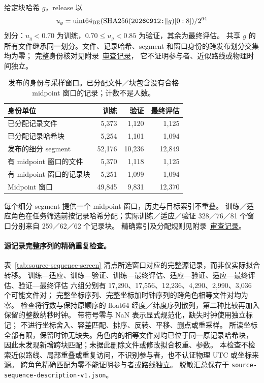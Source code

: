 给定块哈希 \(g\)，release 以
\[
u_g=\operatorname{uint64}_{\rm BE}
(\operatorname{SHA256}(\texttt{20260912:}\Vert g)[0:8])/2^{64}
\]
划分：\(u_g<0.70\) 为训练，\(0.70\leq u_g<0.85\) 为验证，其余为最终评估。
共享 \(g\) 的所有文件继承同一划分。文件、记录哈希、segment 和窗口身份的跨发布划分交集均为零；
完整身份核对见附录~\href{audit-notes.pdf\#sec:source-reconciliation-details}{审查记录}，
它不证明参与者、近似路线或物理时间独立。

\begin{table}[htbp]
\centering\small
\caption{发布的身份与采样窗口。已分配文件／块包含没有合格 midpoint 窗口的记录；计数不是人数。}
\label{tab:release-partition-identities}\hypertarget{tab:release-partition-identities}{}
\begin{tabular}{@{}p{.45\linewidth}rrr@{}}
\toprule
身份单位 & 训练 & 验证 & 最终评估\\
\midrule
已分配记录文件 & 5,373 & 1,120 & 1,125\\
已分配记录哈希块 & 5,254 & 1,101 & 1,094\\
发布的细分 segment & 52,176 & 10,236 & 12,849\\
有 midpoint 窗口的文件 & 5,370 & 1,118 & 1,125\\
有 midpoint 窗口的记录块 & 5,251 & 1,099 & 1,094\\
Midpoint 窗口 & 49,845 & 9,831 & 12,370\\
\bottomrule
\end{tabular}
\end{table}

每个细分 segment 提供一个 midpoint 窗口，历史与目标索引不重叠。
训练／适应角色在任务筛选前按记录哈希分配；实际训练／适应／验证
328／76／81 个窗口分别来自 259／62／62 个记录块。
精确索引及分配规则见附录~\href{audit-notes.pdf\#sec:source-reconciliation-details}{审查记录}。

\paragraph{源记录完整序列的精确重复检查。}\label{sec:source-sequence-screen}\hypertarget{sec:source-sequence-screen}{}
表~\ref{tab:source-sequence-screen} 清点所选窗口对应的完整源记录，而非仅实际拟合转移。
训练—适应、训练—验证、训练—最终评估、适应—验证、适应—最终评估、验证—最终评估
六组分别有 17,290、17,556、12,236、4,290、2,990、3,036 个可能文件对；
完整坐标序列、完整坐标加时钟序列的跨角色相等文件对均为零。
检查将行数与保持原顺序的 float64 经度／纬度序列散列，第二种比较再加入保留的整数纳秒时钟。
带符号零与 NaN 表示显式规范化，缺失时钟使用独立标记；
不进行坐标舍入、容差匹配、排序、反转、平移、删点或重采样。
所读坐标全部有限，保留时钟无缺失。角色内的相等文件对均已位于同一原记录哈希块，
因此未发现新增跨块匹配；未据此删除文件或修改拟合权重、参数。
本检查不检索近似路线、局部重叠或重复访问，不识别参与者，也不认证物理 UTC 或坐标来源。
跨角色精确匹配为零不能证明参与者或路线独立。
脱敏汇总保存于 \texttt{source-sequence-description-v1.json}。

